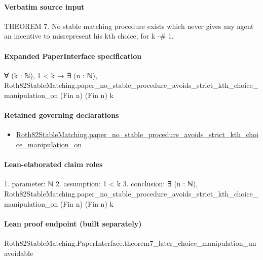 \documentclass[10pt]{article}
\begin{document}
\paragraph{Verbatim source input}
\begin{ReviewVerbatim}
THEOREM 7. No stable matching procedure exists which never gives any agent an
incentive to misrepresent his kth choice, for k -# 1.
\end{ReviewVerbatim}



\paragraph{Expanded PaperInterface specification}
\begin{ReviewVerbatim}
∀ (k : ℕ),
  1 < k →
    ∃ (n : ℕ), Roth82StableMatching.paper_no_stable_procedure_avoids_strict_kth_choice_manipulation_on (Fin n) (Fin n) k
\end{ReviewVerbatim}

\paragraph{Retained governing declarations}
\begin{itemize}\raggedright
\item \hyperlink{governing-declaration-d7d2f9cb7d4bef58}{Roth82\allowbreak{}Stable\allowbreak{}Matching.\allowbreak{}paper\_\allowbreak{}no\_\allowbreak{}stable\_\allowbreak{}procedure\_\allowbreak{}avoids\_\allowbreak{}strict\_\allowbreak{}kth\_\allowbreak{}choice\_\allowbreak{}manipulation\_\allowbreak{}on}
\end{itemize}
\paragraph{Lean-elaborated claim roles}\begin{ReviewVerbatim}
1. parameter: ℕ
2. assumption: 1 < k
3. conclusion: ∃ (n : ℕ), Roth82StableMatching.paper_no_stable_procedure_avoids_strict_kth_choice_manipulation_on (Fin n) (Fin n) k
\end{ReviewVerbatim}

\paragraph{Lean proof endpoint (built separately)}\begin{ReviewVerbatim}
Roth82StableMatching.PaperInterface.theorem7_later_choice_manipulation_unavoidable
\end{ReviewVerbatim}
\end{document}
